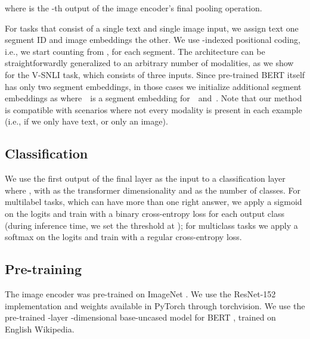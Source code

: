 \documentclass[11pt,a4paper]{article}
\begin{document}
where  is the -th output of the image encoder's final pooling operation.

For tasks that consist of a single text and single image input, we assign text one segment ID and image embeddings the other. We use -indexed positional coding, i.e., we start counting from , for each segment. The architecture can be straightforwardly generalized to an arbitrary number of modalities, as we show for the V-SNLI task, which consists of three inputs. Since pre-trained BERT itself has only two segment embeddings, in those cases we initialize additional segment embeddings as  where~~is a segment embedding for~~and~. Note that our method is compatible with scenarios where not every modality is present in each example (i.e., if we only have text, or only an image).

\subsection{Classification} We use the first output of the final layer as the input to a classification layer  where , with  as the transformer dimensionality and  as the number of classes. For multilabel tasks, which can have more than one right answer, we apply a sigmoid on the logits and train with a binary cross-entropy loss for each output class (during inference time, we set the threshold at ); for multiclass tasks we apply a softmax on the logits and train with a regular cross-entropy loss.

\subsection{Pre-training} The image encoder was pre-trained on ImageNet \cite{Deng:2009imagenet}. We use the ResNet-152 \cite{He:2016cvpr} implementation and weights available in PyTorch \cite{Paszke:2017pytorch} through torchvision. We use the pre-trained -layer -dimensional base-uncased model for BERT \cite{Devlin:2019naacl}, trained on English Wikipedia.
\end{document}
